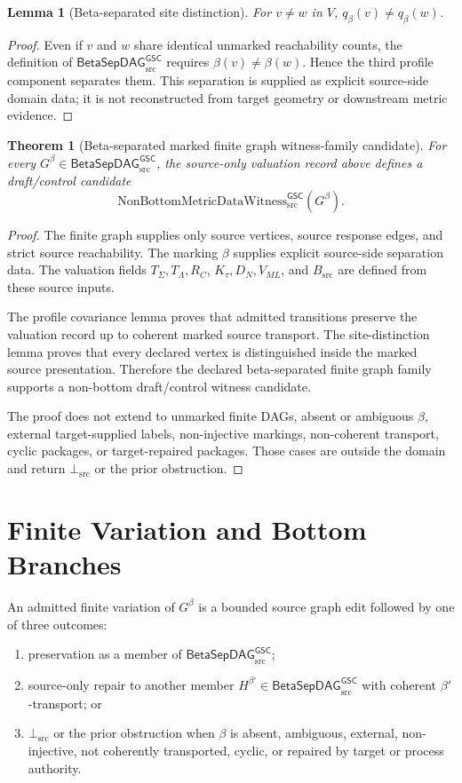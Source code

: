 \documentclass[11pt]{article}
\newcommand{\Witness}{\mathrm{NonBottomMetricDataWitness}_{\mathrm{src}}^{\mathsf{GSC}}}
\newcommand{\BottomSrc}{\bot_{\mathrm{src}}}
\newcommand{\BetaGraph}{\mathsf{BetaSepDAG}_{\mathrm{src}}^{\mathsf{GSC}}}
\newtheorem{lemma}{Lemma}
\newtheorem{theorem}{Theorem}
\begin{document}
\begin{lemma}[Beta-separated site distinction]
For \(v\ne w\) in \(V\), \(q_\beta(v)\ne q_\beta(w)\).
\end{lemma}

\begin{proof}
Even if \(v\) and \(w\) share identical unmarked reachability counts, the
definition of \(\BetaGraph\) requires \(\beta(v)\ne\beta(w)\). Hence the
third profile component separates them. This separation is supplied as
explicit source-side domain data; it is not reconstructed from target
geometry or downstream metric evidence.
\end{proof}

\begin{theorem}[Beta-separated marked finite graph witness-family candidate]
For every \(G^\beta\in\BetaGraph\), the source-only valuation record above
defines a draft/control candidate
\[
  \Witness(G^\beta).
\]
\end{theorem}

\begin{proof}
The finite graph supplies only source vertices, source response edges, and
strict source reachability. The marking \(\beta\) supplies explicit
source-side separation data. The valuation fields \(T_\Sigma,T_\Lambda,R_C\),
\(K_\tau,D_N,V_{ML}\), and \(B_{\mathrm{src}}\) are defined from these source
inputs.

The profile covariance lemma proves that admitted transitions preserve the
valuation record up to coherent marked source transport. The site-distinction
lemma proves that every declared vertex is distinguished inside the marked
source presentation. Therefore the declared beta-separated finite graph family
supports a non-bottom draft/control witness candidate.

The proof does not extend to unmarked finite DAGs, absent or ambiguous
\(\beta\), external target-supplied labels, non-injective markings, non-coherent
transport, cyclic packages, or target-repaired packages. Those cases are
outside the domain and return \(\BottomSrc\) or the prior obstruction.
\end{proof}

\section{Finite Variation and Bottom Branches}

An admitted finite variation of \(G^\beta\) is a bounded source graph edit
followed by one of three outcomes:
\begin{enumerate}[leftmargin=*]
  \item preservation as a member of \(\BetaGraph\);
  \item source-only repair to another member \(H^{\beta'}\in\BetaGraph\) with
  coherent \(\beta'\)-transport; or
  \item \(\BottomSrc\) or the prior obstruction when \(\beta\) is absent,
  ambiguous, external, non-injective, not coherently transported, cyclic, or
  repaired by target or process authority.
\end{enumerate}
\end{document}
